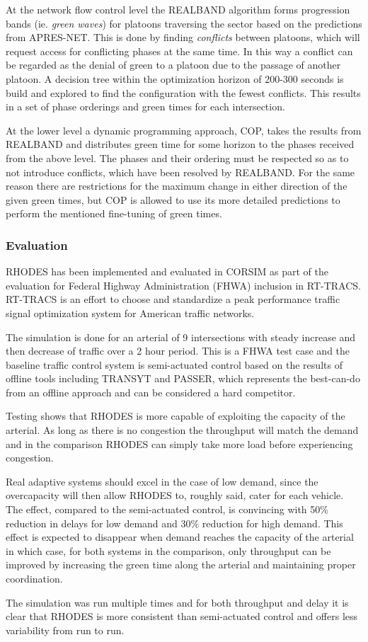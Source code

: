 At the network flow control level the REALBAND algorithm forms
progression bands (ie. \textit{green waves}) for platoons traversing
the sector based on the predictions from APRES-NET. This is done by
finding \textit{conflicts} between platoons, which will request access
for conflicting phases at the same time. In this way a conflict can be
regarded as the denial of green to a platoon due to the passage of
another platoon. A decision tree within the optimization horizon of
200-300 seconds is build and explored to find the configuration with
the fewest conflicts. This results in a set of phase orderings and
green times for each intersection.

At the lower level a dynamic programming approach, COP, takes the
results from REALBAND and distributes green time for some horizon to
the phases received from the above level. The phases and their
ordering must be respected so as to not introduce conflicts, which
have been resolved by REALBAND. For the same reason there are
restrictions for the maximum change in either direction of the given
green times, but COP is allowed to use its more detailed predictions
to perform the mentioned fine-tuning of green times.

\subsubsection*{Evaluation}
RHODES has been implemented and evaluated in CORSIM as part of the
evaluation for Federal Highway Administration (FHWA) inclusion in
RT-TRACS. RT-TRACS is an effort to choose and standardize a peak
performance traffic signal optimization system for American traffic
networks.

The simulation is done for an arterial of 9 intersections with steady
increase and then decrease of traffic over a 2 hour period. This is a
FHWA test case and the baseline traffic control system is
semi-actuated control based on the results of offline tools including
TRANSYT and PASSER, which represents the best-can-do from an offline
approach and can be considered a hard competitor.

Testing shows that RHODES is more capable of exploiting the capacity
of the arterial. As long as there is no congestion the throughput will
match the demand and in the comparison RHODES can simply take more
load before experiencing congestion.

Real adaptive systems should excel in the case of low demand, since
the overcapacity will then allow RHODES to, roughly said, cater for
each vehicle. The effect, compared to the semi-actuated control, is
convincing with 50\% reduction in delays for low demand and 30\%
reduction for high demand. This effect is expected to disappear when
demand reaches the capacity of the arterial in which case, for both
systems in the comparison, only throughput can be improved by
increasing the green time along the arterial and maintaining proper
coordination.

The simulation was run multiple times and for both throughput and
delay it is clear that RHODES is more consistent than semi-actuated
control and offers less variability from run to run.
